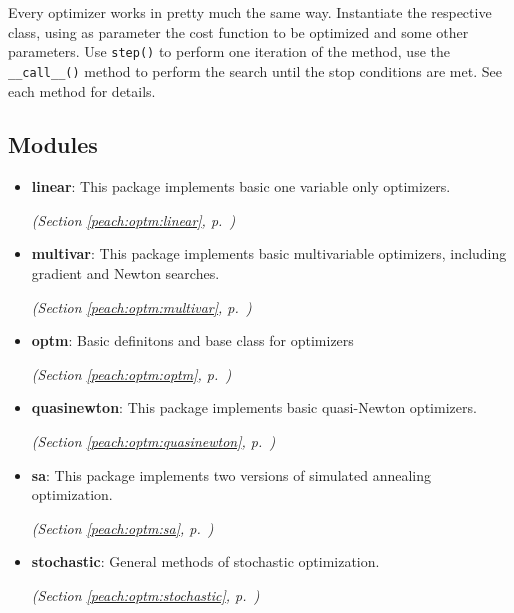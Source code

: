 Every optimizer works in pretty much the same way. Instantiate the respective
class, using as parameter the cost function to be optimized and some other
parameters. Use \texttt{step()} to perform one iteration of the method, use the
\texttt{{\_}{\_}call{\_}{\_}()} method to perform the search until the stop conditions are met.
See each method for details.


\subsection{Modules}

\begin{itemize}
\setlength{\parskip}{0ex}
\item \textbf{linear}: 
This package implements basic one variable only optimizers.


  \textit{(Section \ref{peach:optm:linear}, p.~\pageref{peach:optm:linear})}

\item \textbf{multivar}: 
This package implements basic multivariable optimizers, including gradient and
Newton searches.


  \textit{(Section \ref{peach:optm:multivar}, p.~\pageref{peach:optm:multivar})}

\item \textbf{optm}: 
Basic definitons and base class for optimizers


  \textit{(Section \ref{peach:optm:optm}, p.~\pageref{peach:optm:optm})}

\item \textbf{quasinewton}: 
This package implements basic quasi-Newton optimizers.


  \textit{(Section \ref{peach:optm:quasinewton}, p.~\pageref{peach:optm:quasinewton})}

\item \textbf{sa}: 
This package implements two versions of simulated annealing optimization.


  \textit{(Section \ref{peach:optm:sa}, p.~\pageref{peach:optm:sa})}

\item \textbf{stochastic}: 
General methods of stochastic optimization.


  \textit{(Section \ref{peach:optm:stochastic}, p.~\pageref{peach:optm:stochastic})}

\end{itemize}



